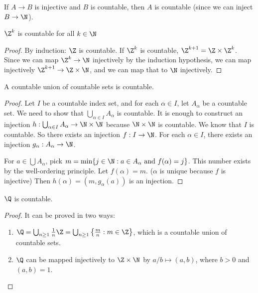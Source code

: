 \documentclass[a4paper]{article}
\begin{document}
  \begin{prop}
    If $A\to B$ is injective and $B$ is countable, then $A$ is countable (since we can inject $B \to \N$).
  \end{prop}

  \begin{prop}
    $\Z^k$ is countable for all $k\in \N$
  \end{prop}

  \begin{proof}
    By induction: $\Z$ is countable. If $\Z^k$ is countable, $\Z^{k + 1} = \Z\times \Z^k$. Since we can map $\Z^k \to \N$ injectively by the induction hypothesis, we can map injectively $\Z^{k + 1}\to \Z\times \N$, and we can map that to $\N$ injectively. 
  \end{proof}

  \begin{thm}
    A countable union of countable sets is countable.
  \end{thm}

  \begin{proof}
    Let $I$ be a countable index set, and for each $\alpha \in I$, let $A_\alpha$ be a countable set. We need to show that $\bigcup_{\alpha\in I} A_\alpha$ is countable. It is enough to construct an injection $h: \bigcup_{\alpha\in I} A_\alpha \to \N\times \N$ because $\N\times\N$ is countable. We know that $I$ is countable. So there exists an injection $f: I\to \N$. For each $\alpha\in I$, there exists an injection $g_\alpha: A_\alpha \to\N$.

    For $a\in \bigcup A_\alpha$, pick $m = \min\{j\in \N: a\in A_{\alpha}\text{ and }f(\alpha) = j\}$. This number exists by the well-ordering principle. Let $f(\alpha) = m$. ($\alpha$ is unique because $f$ is injective) Then $h(\alpha) = (m,g_\alpha(a))$ is an injection.
  \end{proof}

  \begin{prop}
    $\Q$ is countable.
  \end{prop}
  \begin{proof}
    It can be proved in two ways:
    \begin{enumerate}
      \item $\Q = \bigcup_{n\geq 1} \frac{1}{n}\Z = \bigcup_{n\geq 1} \left\{\frac{m}{n}: m\in \Z\right\}$, which is a countable union of countable sets.
      \item $\Q$ can be mapped injectively to $\Z\times \N$ by $a/b\mapsto (a, b)$, where $b > 0$ and $(a, b) = 1$.
    \end{enumerate}
  \end{proof}
\end{document}
